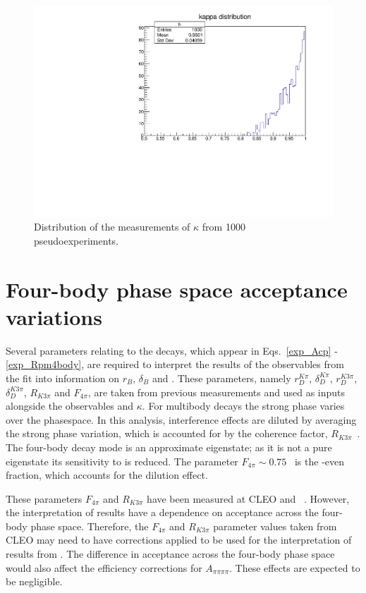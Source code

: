 \begin{figure}[h]
\centering
\includegraphics[width=0.5\linewidth]{figures/results/kappa.pdf}
\caption{Distribution of the measurements of $\kappa$ from 1000 pseudoexperiments.}
\label{kappadistribution}
\end{figure}

\section{Four-body phase space acceptance variations}
\label{sec:interpretation:inputs}

Several parameters relating to the \Dz decays, which appear in Eqs.~\ref{exp_Acp} - \ref{exp_Rpm4body}, are required to interpret the results of the \CP observables from the \CP fit into information on $r_B$, $\delta_B$ and \Pgamma. These parameters, namely $r_D^{K\pi}$, $\delta_D^{K\pi}$, $r_D^{K3\pi}$, $\delta_D^{K3\pi}$, $R_{K3\pi}$ and $F_{4\pi}$, are taken from previous measurements and used as inputs alongside the \CP observables and $\kappa$. For multibody \decay{\D}{\Kmp\pipm\pimp\pipm} decays the strong phase varies over the phasespace. In this analysis, interference effects are diluted by averaging the strong phase variation, which is accounted for by the coherence factor, $R_{K3\pi}$~\cite{charmk3pi,LHCb-PAPER-2015-057}. The four-body \Dz decay mode \decay{\D}{\pip\pim\pip\pim} is an approximate \CP eigenstate; as it is not a pure \CP eigenstate its sensitivity to \Pgamma is reduced. The parameter $F_{4\pi} \sim 0.75$~\cite{charm4pi} is the \CP-even fraction, which accounts for the dilution effect.

These parameters $F_{4\pi}$ and $R_{K3\pi}$ have been measured at CLEO and \lhcb~\cite{charmk3pi,LHCb-PAPER-2015-057,charm4pi}. However, the interpretation of \lhcb results have a dependence on \lhcb acceptance across the four-body phase space. Therefore, the $F_{4\pi}$ and $R_{K3\pi}$ parameter values taken from CLEO may need to have corrections applied to be used for the interpretation of results from \lhcb. The difference in \lhcb acceptance across the four-body phase space would also affect the efficiency corrections for $A_{\pi\pi\pi\pi}$. These effects are expected to be negligible.

